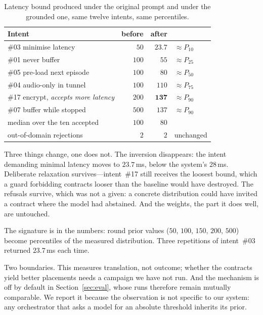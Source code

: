 \documentclass[conference]{IEEEtran}
\begin{document}
\begin{table}[t]
\centering
\caption{Latency bound produced under the original prompt and under the
grounded one, same twelve intents, same percentiles.}
\label{tab:grounded}
\footnotesize
\setlength{\tabcolsep}{4pt}
\begin{tabular}{@{}lrrl@{}}
\toprule
\textbf{Intent} & \textbf{before} & \textbf{after} & \\
\midrule
\#03 minimise latency      & $50$  & $\mathbf{23.7}$ & $\approx P_{10}$\\
\#01 never buffer          & $100$ & $55$   & $\approx P_{25}$\\
\#05 pre-load next episode & $100$ & $80$   & $\approx P_{50}$\\
\#04 audio-only in tunnel  & $100$ & $110$  & $\approx P_{75}$\\
\#17 encrypt, \emph{accepts more latency} & $200$ & $\mathbf{137}$ & $\approx P_{90}$\\
\#07 buffer while stopped  & $500$ & $137$  & $\approx P_{90}$\\
\midrule
median over the ten accepted & $100$ & $80$ & \\
out-of-domain rejections     & $2$   & $2$  & unchanged\\
\bottomrule
\end{tabular}
\end{table}

Three things change, one does not. The inversion disappears: the intent
demanding minimal latency moves to $23.7$\,ms, below the system's $28$\,ms.
Deliberate relaxation survives---intent~\#17 still receives the loosest
bound, which a guard forbidding contracts looser than the baseline would have
destroyed. The refusals survive, which was not a given: a concrete
distribution could have invited a contract where the model had abstained. And
the weights, the part it does well, are untouched.

The signature is in the numbers: round prior values ($50$, $100$, $150$,
$200$, $500$) become percentiles of the measured distribution. Three
repetitions of intent~\#03 returned $23.7$\,ms each time.

Two boundaries. This measures translation, not outcome; whether the contracts
yield better placements needs a campaign we have not run. And the mechanism
is off by default in Section~\ref{sec:eval}, whose runs therefore remain
mutually comparable. We report it because the observation is not specific to
our system: any orchestrator that asks a model for an absolute threshold
inherits its prior.
\end{document}
